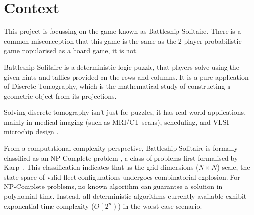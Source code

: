 %


\section{Context}\label{sec:context}

This project is focussing on the game known as Battleship Solitaire. There is a common misconception that this game is the same as the 2-player probabilistic game popularised as a board game, it is not.

Battleship Solitaire is a deterministic logic puzzle, that players solve using the given hints and tallies provided on the rows and columns. It is a pure application of Discrete Tomography, which is the mathematical study of constructing a geometric object from its projections.

Solving discrete tomography isn't just for puzzles, it has real-world applications, mainly in medical imaging (such as MRI/CT scans), scheduling, and VLSI microchip design \citep{herman1999discrete}.

From a computational complexity perspective, Battleship Solitaire is formally classified as an NP-Complete problem \citep{sevenster2004battleships}, a class of problems first formalised by Karp~\citep{karp1972reducibility}. This classification indicates that as the grid dimensions ($N \times N$) scale, the state space of valid fleet configurations undergoes combinatorial explosion. For NP-Complete problems, no known algorithm can guarantee a solution in polynomial time. Instead, all deterministic algorithms currently available exhibit exponential time complexity ($O(2^n)$) in the worst-case scenario.

